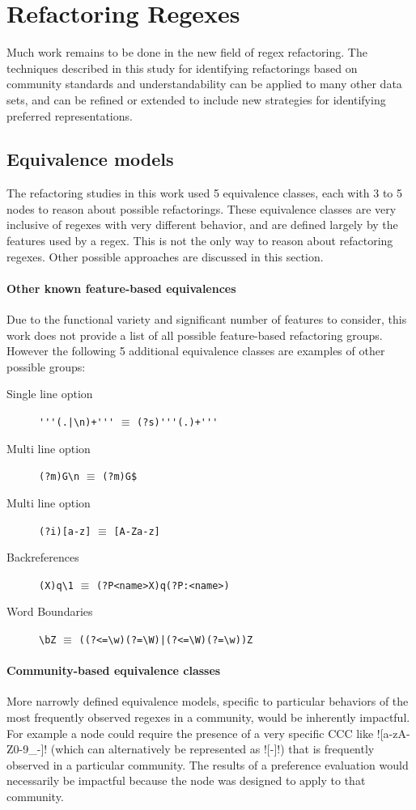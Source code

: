 \section{Refactoring Regexes}
Much work remains to be done in the new field of regex refactoring.  The techniques described in this study for identifying refactorings based on community standards and understandability can be applied to many other data sets, and can be refined or extended to include new strategies for identifying preferred representations.

\subsection{Equivalence models}
The refactoring studies in this work used 5 equivalence classes, each with 3 to 5 nodes to reason about possible refactorings.  These equivalence classes are very inclusive of regexes with very different behavior, and are defined largely by the features used by a regex.  This is not the only way to reason about refactoring regexes.  Other possible approaches are discussed in this section.

\paragraph{Other known feature-based equivalences}  Due to the functional variety and significant number of features to consider, this work does not provide a list of all possible feature-based refactoring groups.  However the following 5 additional equivalence classes are examples of other possible groups:
\begin{description}
\item[Single line option]  \verb!'''(.|\n)+'''! $\equiv$ \verb!(?s)'''(.)+'''!
\item[Multi line option]  \verb!(?m)G\n! $\equiv$ \verb!(?m)G$!
\item[Multi line option]  \verb!(?i)[a-z]! $\equiv$ \verb![A-Za-z]!
\item[Backreferences]  \verb!(X)q\1! $\equiv$ \verb!(?P<name>X)q(?P:<name>)!
\item[Word Boundaries]  \verb!\bZ! $\equiv$ \verb!((?<=\w)(?=\W)|(?<=\W)(?=\w))Z!
\end{description}

\paragraph{Community-based equivalence classes}  More narrowly defined equivalence models, specific to particular behaviors of the most frequently observed regexes in a community, would be inherently impactful.  For example a node could require the presence of a very specific CCC like \cverb![a-zA-Z0-9_-]! (which can alternatively be represented as \cverb![\w-]!) that is frequently observed in a particular community.  The results of a preference evaluation would necessarily be impactful because the node was designed to apply to that community.

